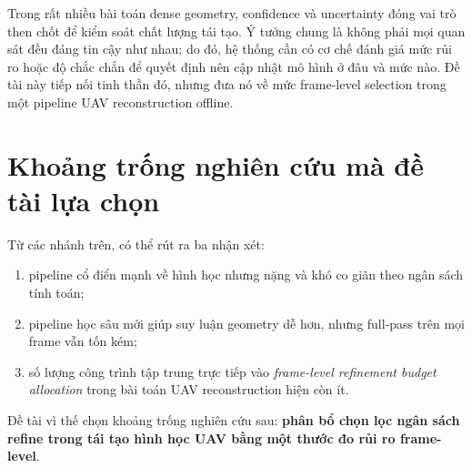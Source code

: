 \documentclass[../DoAn.tex]{subfiles}
\begin{document}
Trong rất nhiều bài toán dense geometry, confidence và uncertainty đóng vai trò then chốt để kiểm soát chất lượng tái tạo. Ý tưởng chung là không phải mọi quan sát đều đáng tin cậy như nhau; do đó, hệ thống cần có cơ chế đánh giá mức rủi ro hoặc độ chắc chắn để quyết định nên cập nhật mô hình ở đâu và mức nào. Đề tài này tiếp nối tinh thần đó, nhưng đưa nó về mức frame-level selection trong một pipeline UAV reconstruction offline.

\section{Khoảng trống nghiên cứu mà đề tài lựa chọn}

Từ các nhánh trên, có thể rút ra ba nhận xét:
\begin{enumerate}[leftmargin=1.5em]
  \item pipeline cổ điển mạnh về hình học nhưng nặng và khó co giãn theo ngân sách tính toán;
  \item pipeline học sâu mới giúp suy luận geometry dễ hơn, nhưng full-pass trên mọi frame vẫn tốn kém;
  \item số lượng công trình tập trung trực tiếp vào \textit{frame-level refinement budget allocation} trong bài toán UAV reconstruction hiện còn ít.
\end{enumerate}

Đề tài vì thế chọn khoảng trống nghiên cứu sau: \textbf{phân bổ chọn lọc ngân sách refine trong tái tạo hình học UAV bằng một thước đo rủi ro frame-level}.
\end{document}
